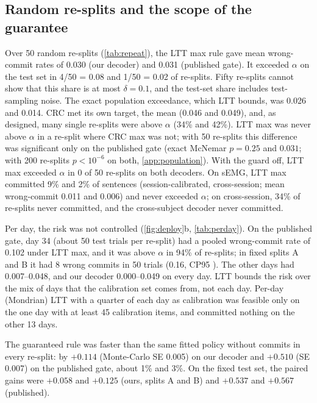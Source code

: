 \subsection{Random re-splits and the scope of the guarantee}
\label{sec:res-resplits}
\label{sec:res-perday}
Over 50 random re-splits (\cref{tab:repeat}), the LTT max rule gave mean wrong-commit rates of 0.030 (our decoder) and 0.031 (published gate). It exceeded $\alpha$ on the test set in 4/50 = 0.08  and 1/50 = 0.02  of re-splits. Fifty re-splits cannot show that this share is at most $\delta = 0.1$, and the test-set share includes test-sampling noise. The exact population exceedance, which LTT bounds, was 0.026 and 0.014. CRC met its own target, the mean (0.046 and 0.049), and, as designed, many single re-splits were above $\alpha$ (34\% and 42\%). LTT max was never above $\alpha$ in a re-split where CRC max was not; with 50 re-splits this difference was significant only on the published gate (exact McNemar $p = 0.25$ and $0.031$; with 200 re-splits $p < 10^{-6}$ on both, \cref{app:population}). With the guard off, LTT max exceeded $\alpha$ in 0 of 50 re-splits on both decoders. On sEMG, LTT max committed 9\% and 2\% of sentences (session-calibrated, cross-session; mean wrong-commit 0.011 and 0.006) and never exceeded $\alpha$; on cross-session, 34\% of re-splits never committed, and the cross-subject decoder never committed.

Per day, the risk was not controlled (\cref{fig:deploy}b, \cref{tab:perday}). On the published gate, day 34 (about 50 test trials per re-split) had a pooled wrong-commit rate of 0.102 under LTT max, and it was above $\alpha$ in 94\% of re-splits; in fixed splits A and B it had 8 wrong commits in 50 trials (0.16, CP95 ). The other days had 0.007--0.048, and our decoder 0.000--0.049 on every day. LTT bounds the risk over the mix of days that the calibration set comes from, not each day. Per-day (Mondrian) LTT with a quarter of each day as calibration was feasible only on the one day with at least 45 calibration items, and committed nothing on the other 13 days.

The guaranteed rule was faster than the same fitted policy without commits in every re-split: by $+0.114$ \ewpm{} (Monte-Carlo SE 0.005) on our decoder and $+0.510$ (SE 0.007) on the published gate, about 1\% and 3\%. On the fixed test set, the paired gains were $+0.058$  and $+0.125$  (ours, splits A and B) and $+0.537$  and $+0.567$  (published).

